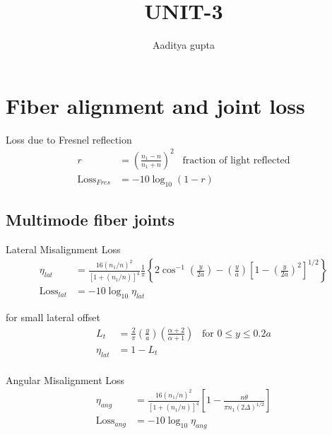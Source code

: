 \documentclass[12pt, onecolumn]{article}
\title{\bf{UNIT-3}}
\author{Aaditya gupta}
\begin{document}
\maketitle

\section{Fiber alignment and joint loss}
    Loss due to Fresnel reflection
    \begin{equation}
        \begin{aligned}
            r & = \left( \displaystyle\frac{n_1 - n}{n_1 + n} \right)^2 \;\;\; \text{fraction of light reflected} \\
            \text{Loss}_{Fres} &= -10\log_{10}(1-r)
        \end{aligned}
        \label{eq:fresnel_loss}
    \end{equation}

    \subsection{Multimode fiber joints}
        Lateral Misalignment Loss
        \begin{equation}
            \begin{aligned}
                \eta_{lat} &= \displaystyle\frac{16(n_1/n)^2}{[1+(n_1/n)]^4} \frac{1}{\pi} 
                            \left\{ 2\cos^{-1} \left(\frac{y}{2a}\right) - \left(\frac{y}{a}\right)\left[1-\left(\frac{y}{2a}\right)^2\right]^{1/2} \right\} \\
                \text{Loss}_{lat} &= -10\log_{10} \eta_{lat}
            \end{aligned}
            \label{eq:lat_misalign_loss}
        \end{equation}

        for small lateral offset
        \begin{equation}
            \begin{aligned}
                L_t &= \frac{2}{\pi} \left(\frac{y}{a}\right)\left(\frac{\alpha+2}{\alpha+1}\right) \;\;\; \text{for } 0\leq y \leq 0.2 a \\
                \eta_{lat} &= 1 - L_t \\
            \end{aligned}
            \label{eq:small_lat}
        \end{equation}

        Angular Misalignment Loss
        \begin{equation}
            \begin{aligned}
                \eta_{ang} &= \displaystyle\frac{16(n_1/n)^2}{[1+(n_1/n)]^4} \left[ 1 - \displaystyle\frac{ n\theta }{ \pi n_1 (2\Delta)^{1/2}} \right]  \\
                \text{Loss}_{ang} &= -10 \log_{10} \eta_{ang} \\
            \end{aligned}
            \label{eq:and_loss}
        \end{equation}
\end{document}
